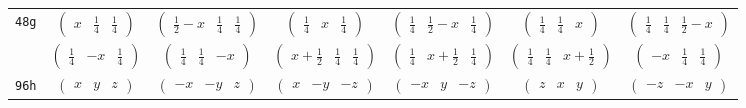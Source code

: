 \documentclass[fleqn,9pt,landscape]{jsarticle}
\begin{document}
\begin{center}
\begin{longtable}{ccccccc}
{\tt 48g} & $ \begin{pmatrix} x & \frac{1}{4} & \frac{1}{4} \end{pmatrix} $ & $ \begin{pmatrix} \frac{1}{2} - x & \frac{1}{4} & \frac{1}{4} \end{pmatrix} $ & $ \begin{pmatrix} \frac{1}{4} & x & \frac{1}{4} \end{pmatrix} $ & $ \begin{pmatrix} \frac{1}{4} & \frac{1}{2} - x & \frac{1}{4} \end{pmatrix} $ & $ \begin{pmatrix} \frac{1}{4} & \frac{1}{4} & x \end{pmatrix} $ & $ \begin{pmatrix} \frac{1}{4} & \frac{1}{4} & \frac{1}{2} - x \end{pmatrix} $ \\
& $ \begin{pmatrix} \frac{1}{4} & - x & \frac{1}{4} \end{pmatrix} $ & $ \begin{pmatrix} \frac{1}{4} & \frac{1}{4} & - x \end{pmatrix} $ & $ \begin{pmatrix} x + \frac{1}{2} & \frac{1}{4} & \frac{1}{4} \end{pmatrix} $ & $ \begin{pmatrix} \frac{1}{4} & x + \frac{1}{2} & \frac{1}{4} \end{pmatrix} $ & $ \begin{pmatrix} \frac{1}{4} & \frac{1}{4} & x + \frac{1}{2} \end{pmatrix} $ & $ \begin{pmatrix} - x & \frac{1}{4} & \frac{1}{4} \end{pmatrix} $ \\ \hline
{\tt 96h} & $ \begin{pmatrix} x & y & z \end{pmatrix} $ & $ \begin{pmatrix} - x & - y & z \end{pmatrix} $ & $ \begin{pmatrix} x & - y & - z \end{pmatrix} $ & $ \begin{pmatrix} - x & y & - z \end{pmatrix} $ & $ \begin{pmatrix} z & x & y \end{pmatrix} $ & $ \begin{pmatrix} - z & - x & y \end{pmatrix} $ \\

\end{longtable}
\end{center}
\end{document}
